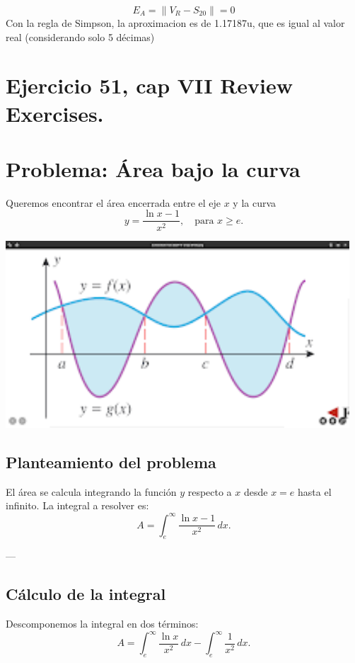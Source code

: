\documentclass[11pt,letterpaper]{article}
\begin{document}
\begin{equation*}
    E_A=\|V_R-S_{20} \|=0
\end{equation*}
Con la regla de Simpson, la aproximacion es de 1.17187u, que es igual al valor real (considerando solo 5 décimas)

\section{Ejercicio 51, cap VII Review Exercises.}
\section*{Problema: Área bajo la curva}

Queremos encontrar el área encerrada entre el eje \(x\) y la curva 
\[
y = \frac{\ln x - 1}{x^2}, \quad \text{para } x \geq e.
\]

\includegraphics[height=7cm]{./imagenes/ej51.png}

\subsection*{Planteamiento del problema}

El área se calcula integrando la función \(y\) respecto a \(x\) desde \(x = e\) hasta el infinito. La integral a resolver es:
\[
A = \int_{e}^{\infty} \frac{\ln x - 1}{x^2} \, dx.
\]

---

\subsection*{Cálculo de la integral}

Descomponemos la integral en dos términos:
\[
A = \int_{e}^{\infty} \frac{\ln x}{x^2} \, dx - \int_{e}^{\infty} \frac{1}{x^2} \, dx.
\]
\end{document}
